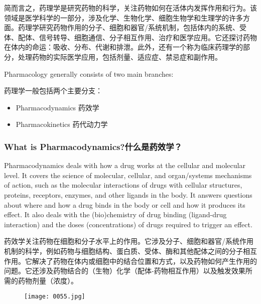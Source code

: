 \documentclass[dvipsnames, svgnames,a4paper,11pt]{article}
\begin{document}
简而言之，药理学是研究药物的科学，关注药物如何在活体内发挥作用和行为。该领域是医学科学的一部分，涉及化学、生物化学、细胞生物学和生理学的许多方面。药理学研究药物作用的分子、细胞和器官/系统机制，包括体内的系统、受体、配体、信号转导、细胞通信、分子相互作用、治疗和医学应用。它还探讨药物在体内的命运：吸收、分布、代谢和排泄。此外，还有一个称为临床药理学的部分，处理药物的实际医学应用，包括剂量、适应症、禁忌症和副作用。

Pharmacology generally consists of two main branches:

药理学一般包括两个主要分支：

\begin{itemize}

      \item Pharmacodynamics
            药效学

      \item Pharmacokinetics
            药代动力学

\end{itemize}
\subsubsection{What is Pharmacodynamics?什么是药效学？}

Pharmacodynamics deals with how a drug works at the cellular and molecular level. It covers the science of molecular, cellular, and organ/systems mechanisms of action, such as the molecular interactions of drugs with cellular structures, proteins, receptors, enzymes, and other ligands in the body. It answers questions about where and how a drug binds in the body or cell and how it produces its effect. It also deals with the (bio)chemistry of drug binding (ligand-drug interaction) and the doses (concentrations) of drugs required to trigger an effect.

药效学关注药物在细胞和分子水平上的作用。它涉及分子、细胞和器官/系统作用机制的科学，例如药物与细胞结构、蛋白质、受体、酶和其他配体之间的分子相互作用。它解决了药物在体内或细胞中的结合位置和方式，以及药物如何产生作用的问题。它还涉及药物结合的（生物）化学（配体-药物相互作用）以及触发效果所需的药物剂量（浓度）。

\begin{figure}[ht]
    \centering
    \texttt{[image: 0055.jpg]}
     \label{fig46}
\end{figure}
\end{document}

